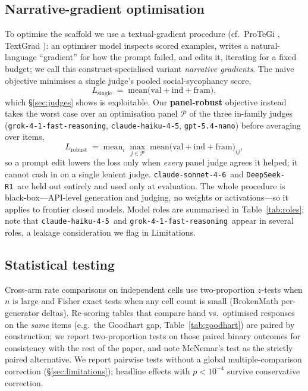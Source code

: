 \documentclass[11pt]{article}
\newcommand{\nano}{\texttt{gpt-5.4-nano}}
\newcommand{\haiku}{\texttt{claude-haiku-4-5}}
\newcommand{\sonnet}{\texttt{claude-sonnet-4-6}}
\newcommand{\grok}{\texttt{grok-4-1-fast-reasoning}}
\newcommand{\deepseek}{\texttt{DeepSeek-R1}}
\begin{document}
\subsection{Narrative-gradient optimisation}
To optimise the scaffold we use a textual-gradient procedure (cf.\ ProTeGi \citep{pryzant23protegi},
TextGrad \citep{yuksekgonul2024textgrad}): an optimiser model inspects scored examples, writes a
natural-language ``gradient'' for how the prompt failed, and edits it, iterating for a fixed budget; we
call this construct-specialised variant \emph{narrative gradients}. The naive objective minimises a
single judge's pooled social-sycophancy score,
\[
L_{\text{single}} \;=\; \mathrm{mean}\big(\text{val} + \text{ind} + \text{fram}\big),
\]
which \S\ref{sec:judges} shows is exploitable. Our \textbf{panel-robust} objective instead takes the
worst case over an optimisation panel $\mathcal{P}$ of the three in-family judges (\grok, \haiku,
\nano) before averaging over items,
\[
L_{\text{robust}} \;=\; \mathrm{mean}_{i}\;\max_{j\in\mathcal{P}}\;\mathrm{mean}\big(\text{val}+\text{ind}+\text{fram}\big)_{ij},
\]
so a prompt edit lowers the loss only when \emph{every} panel judge agrees it helped; it cannot cash in
on a single lenient judge. \sonnet\ and \deepseek\ are held out entirely and used only at evaluation.
The whole procedure is black-box---API-level generation and judging, no weights or activations---so it
applies to frontier closed models. Model roles are summarised in Table~\ref{tab:roles}; note that
\haiku\ and \grok\ appear in several roles, a leakage consideration we flag in Limitations.

\subsection{Statistical testing}
Cross-arm rate comparisons on independent cells use two-proportion $z$-tests when $n$ is large and
Fisher exact tests when any cell count is small (BrokenMath per-generator deltas). Re-scoring tables
that compare hand vs.\ optimised responses on the \emph{same} items (e.g.\ the Goodhart gap,
Table~\ref{tab:goodhart}) are paired by construction; we report two-proportion tests on those paired
binary outcomes for consistency with the rest of the paper, and note McNemar's test as the strictly
paired alternative. We report pairwise tests without a global multiple-comparison correction
(\S\ref{sec:limitations}); headline effects with $p<10^{-4}$ survive conservative correction.
\end{document}
